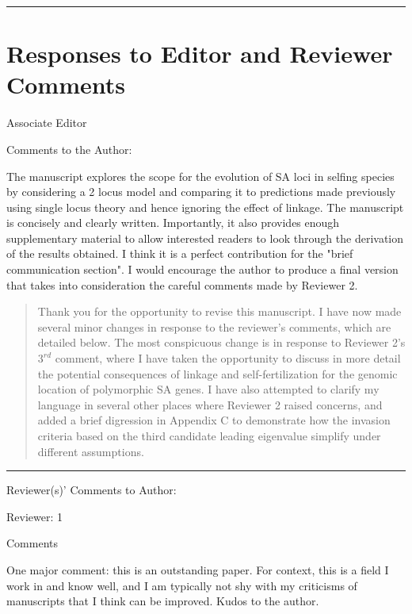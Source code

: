 \documentclass[11pt]{article}
\begin{document}
\bigskip
\noindent \rule{\textwidth}{0.4pt}
\bigskip

\newpage{}

\section*{Responses to Editor and Reviewer Comments}


Associate Editor

\noindent Comments to the Author:
\bigskip 

The manuscript explores the scope for the evolution of SA loci in selfing species by considering a 2 locus model and comparing it to predictions made previously using single locus theory and hence ignoring the effect of linkage. The manuscript is concisely and clearly written. Importantly, it also provides enough supplementary material to allow interested readers to look through the derivation of the results obtained. I think it is a perfect contribution for the "brief communication section". I would encourage the author to produce a final version that takes into consideration the careful comments made by Reviewer 2.

	\begin{quote}
		Thank you for the opportunity to revise this manuscript. I have now made several minor changes in response to the reviewer's comments, which are detailed below. The most conspicuous change is in response to Reviewer 2's $3^{rd}$ comment, where I have taken the opportunity to discuss in more detail the potential consequences of linkage and self-fertilization for the genomic location of polymorphic SA genes. I have also attempted to clarify my language in several other places where Reviewer 2 raised concerns, and added a brief digression in Appendix C to demonstrate how the invasion criteria based on the third candidate leading eigenvalue simplify under different assumptions.
	\end{quote}

\bigskip
\noindent \rule{8cm}{0.4pt}
\bigskip

\noindent Reviewer(s)' Comments to Author:
\bigskip

\noindent Reviewer: 1
\bigskip

\noindent Comments
\bigskip

\noindent One major comment: this is an outstanding paper. For context, this is a field I work in and know well, and I am typically not shy with my criticisms of manuscripts that I think can be improved. Kudos to the author.
\end{document}

